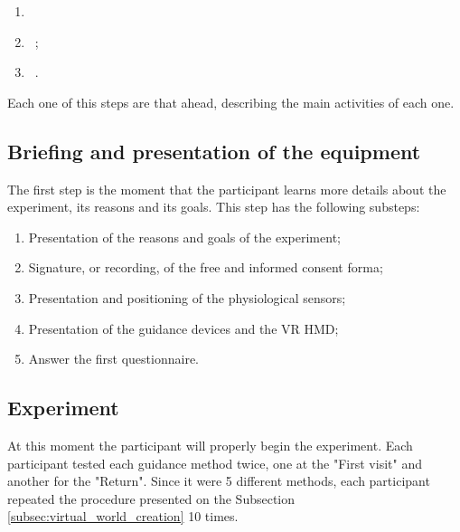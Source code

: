 \begin{enumerate}[label = Step \arabic* --]
    \setlength\itemindent{7ex}
    \item ~
    \item ~; \label{itm:experiment}
    \item ~.
\end{enumerate}

Each one of this steps are that ahead, describing the main activities of each one.

\subsection{Briefing and presentation of the equipment}
\label{subsec:briefing}

The first step is the moment that the participant learns more details about the experiment, its reasons and its goals. This step has the following substeps:

\begin{enumerate}[label = 1.\arabic* --]
    \setlength\itemindent{4ex}
    \item Presentation of the reasons and goals of the experiment;
    \item Signature, or recording, of the free and informed consent forma;
    \item Presentation and positioning of the physiological sensors;
    \item Presentation of the guidance devices and the VR HMD;
    \item Answer the first questionnaire.
\end{enumerate}


\subsection{Experiment}
\label{subsec:experiment}

At this moment the participant will properly begin the experiment. Each participant tested each guidance method twice, one at the "First visit" and another for the "Return". Since it were 5 different methods, each participant repeated the procedure presented on the Subsection \ref{subsec:virtual_world_creation} 10 times.

